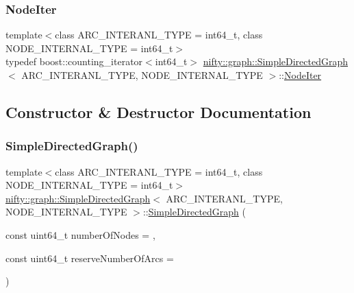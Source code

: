 \subsubsection{\texorpdfstring{Node\+Iter}{NodeIter}}
{\footnotesize\ttfamily template$<$class A\+R\+C\+\_\+\+I\+N\+T\+E\+R\+A\+N\+L\+\_\+\+T\+Y\+PE  = int64\+\_\+t, class N\+O\+D\+E\+\_\+\+I\+N\+T\+E\+R\+N\+A\+L\+\_\+\+T\+Y\+PE  = int64\+\_\+t$>$ \\
typedef boost\+::counting\+\_\+iterator$<$int64\+\_\+t$>$ \hyperlink{classnifty_1_1graph_1_1SimpleDirectedGraph}{nifty\+::graph\+::\+Simple\+Directed\+Graph}$<$ A\+R\+C\+\_\+\+I\+N\+T\+E\+R\+A\+N\+L\+\_\+\+T\+Y\+PE, N\+O\+D\+E\+\_\+\+I\+N\+T\+E\+R\+N\+A\+L\+\_\+\+T\+Y\+PE $>$\+::\hyperlink{classnifty_1_1graph_1_1SimpleDirectedGraph_a50b05474da6846da32398e01be9e3d30}{Node\+Iter}}



\subsection{Constructor \& Destructor Documentation}
\mbox{\label{classnifty_1_1graph_1_1SimpleDirectedGraph_a81190fff5233f90e9fb5cbb29fc46bda}} 
\subsubsection{\texorpdfstring{Simple\+Directed\+Graph()}{SimpleDirectedGraph()}}
{\footnotesize\ttfamily template$<$class A\+R\+C\+\_\+\+I\+N\+T\+E\+R\+A\+N\+L\+\_\+\+T\+Y\+PE  = int64\+\_\+t, class N\+O\+D\+E\+\_\+\+I\+N\+T\+E\+R\+N\+A\+L\+\_\+\+T\+Y\+PE  = int64\+\_\+t$>$ \\
\hyperlink{classnifty_1_1graph_1_1SimpleDirectedGraph}{nifty\+::graph\+::\+Simple\+Directed\+Graph}$<$ A\+R\+C\+\_\+\+I\+N\+T\+E\+R\+A\+N\+L\+\_\+\+T\+Y\+PE, N\+O\+D\+E\+\_\+\+I\+N\+T\+E\+R\+N\+A\+L\+\_\+\+T\+Y\+PE $>$\+::\hyperlink{classnifty_1_1graph_1_1SimpleDirectedGraph}{Simple\+Directed\+Graph} (\begin{DoxyParamCaption}\item[{const uint64\+\_\+t}]{number\+Of\+Nodes = {},  }\item[{const uint64\+\_\+t}]{reserve\+Number\+Of\+Arcs = {} }\end{DoxyParamCaption})\hspace{0.3cm}{\ttfamily [inline]}}



